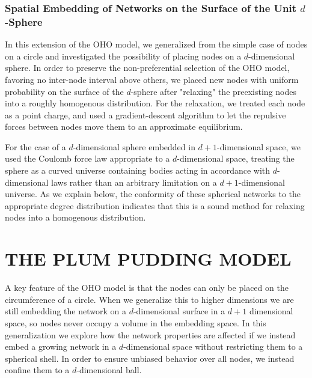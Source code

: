\documentclass[aps,pre,reprint,superscriptaddress,amsmath,amssymb,nofootinbib]{revtex4-1}
\begin{document}
\subsubsection{Spatial Embedding of Networks on the Surface of the Unit $d$-Sphere}
In this extension of the OHO model, we generalized from the simple case of nodes on a circle and investigated the possibility of placing nodes on a $d$-dimensional sphere.
In order to preserve the non-preferential selection of the OHO model, favoring no inter-node interval above others, we placed new nodes with uniform probability on the surface of the $d$-sphere after "relaxing" the preexisting nodes into a roughly homogenous distribution. 
For the relaxation, we treated each node as a point charge, and used a gradient-descent algorithm to let the repulsive forces between nodes move them to an approximate equilibrium.

For the case of a $d$-dimensional sphere embedded in $d+1$-dimensional space, we used the Coulomb force law appropriate to a $d$-dimensional space, treating the sphere as a curved universe containing bodies acting in accordance with $d$-dimensional laws rather than an arbitrary limitation on a $d+1$-dimensional universe.  
As we explain below, the conformity of these spherical networks to the appropriate degree distribution indicates that this is a sound method for relaxing nodes into a homogenous distribution.

\section{THE PLUM PUDDING MODEL}
A key feature of the OHO model is that the nodes can only be placed on the circumference of a circle. 
When we generalize this to higher dimensions we are still embedding the network on a $d$-dimensional surface in a $d+1$ dimensional space, so nodes never occupy a volume in the embedding space.
In this generalization we explore how the network properties are affected if we instead embed a growing network in a $d$-dimensional space without restricting them to a spherical shell.  
In order to ensure unbiased behavior over all nodes, we instead confine them to a $d$-dimensional ball. 
\end{document}
